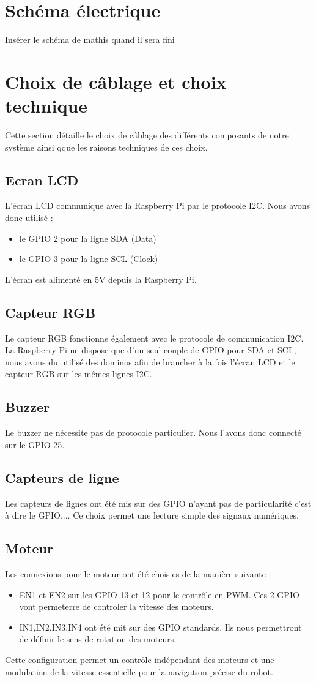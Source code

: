 \section{Schéma électrique}
Insérer le schéma de mathis quand il sera fini

\section{Choix de câblage et choix technique}
Cette section détaille le choix de câblage des différents composants de notre système ainsi qque les raisons techniques de ces choix.

\subsection{Ecran LCD} 
L'écran LCD communique avec la Raspberry Pi par le protocole I2C. Nous avons donc utilisé :
\begin{itemize}
    \item le GPIO 2 pour la ligne SDA (Data)
    \item le GPIO 3 pour la ligne SCL (Clock)
\end{itemize}
L'écran est alimenté en 5V depuis la Raspberry Pi.

\subsection{Capteur RGB}  
Le capteur RGB fonctionne également avec le protocole de communication I2C. La Raspberry Pi ne dispose que d'un seul couple de GPIO pour SDA et SCL, nous avons du utilisé des dominos afin de brancher à la fois l'écran LCD et le capteur RGB sur les mêmes lignes I2C.

\subsection{Buzzer}
Le buzzer ne nécessite pas de protocole particulier. Nous l'avons donc connecté sur le GPIO 25.

\subsection{Capteurs de ligne}
Les capteurs de lignes ont été mis sur des GPIO n'ayant pas de particularité c'est à dire le GPIO.... Ce choix permet une lecture simple des signaux numériques.

\subsection{Moteur}  
Les connexions pour le moteur ont été choisies de la manière suivante :
\begin{itemize}
    \item EN1 et EN2 sur les GPIO 13 et 12 pour le contrôle en PWM. Ces 2 GPIO vont permeterre de controler la vitesse des moteurs.
    \item IN1,IN2,IN3,IN4 ont été mit sur des GPIO standards. Ils nous permettront de définir le sens de rotation des moteurs.
\end{itemize}
Cette configuration permet un contrôle indépendant des moteurs et une modulation de la vitesse essentielle pour la navigation précise du robot.

